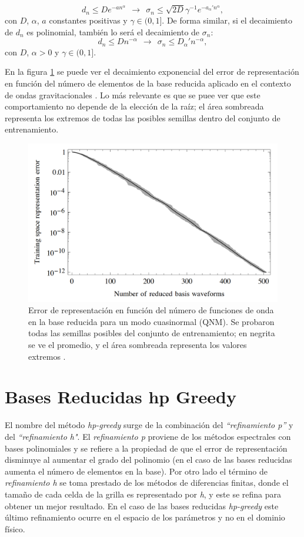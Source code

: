 \[
d_n \leq De^{-an^{\alpha}} \ \ \rightarrow \ \ \sigma_n \leq \sqrt{2D} \gamma^{-1} e^{-a_{\alpha}'n^{\alpha}},
\]
con $D$, $\alpha$, $a$ constantes positivas y $\gamma \in (0,1]$.
De forma similar, si el decaimiento de $d_n$ es polinomial, también lo será el decaimiento de $\sigma_n$:
\[
d_n \leq D n^{-\alpha} \ \ \rightarrow \ \ \sigma_n \leq D_{\alpha}'n^{-\alpha},
\]
con $D$, $\alpha > 0$ y $\gamma \in (0, 1]$.

En la figura \ref{fig:rb_vs_n} se puede ver el decaimiento exponencial del error de representación en función del número de elementos de la base reducida aplicado en el contexto de ondas gravitacionales \cite{Caudill_2012}. Lo más relevante es que se puee ver que este comportamiento no depende de la elección de la raíz; el área sombreada representa los extremos de todas las posibles semillas dentro del conjunto de entrenamiento.


\begin{figure}[h!]
\centering
\includegraphics[width=.8\columnwidth]{figs/rb_vs_n.png}
\caption{Error de representación en función del número de funciones de onda en la base reducida para un modo cuasinormal (QNM). Se probaron todas las semillas posibles del conjunto de entrenamiento; en negrita se ve el promedio, y el área sombreada representa los valores extremos \cite{Caudill_2012}.}
\label{fig:rb_vs_n}
\end{figure}

\section{Bases Reducidas hp Greedy}

El nombre del método \textit{hp-greedy} \cite{Cerino:2022dhr} surge de la combinación del \textit{``refinamiento p''} y del \textit{``refinamiento h"}. El \textit{refinamiento p} proviene de los métodos espectrales con bases polinomiales \cite{hesthaven_gottlieb_gottlieb_2007} y se refiere a la propiedad de que el error de representación disminuye al aumentar el grado del polinomio (en el caso de las bases reducidas aumenta el número de elementos en la base). Por otro lado el término de \textit{refinamiento h} se toma prestado de los métodos de diferencias finitas, donde el tamaño de cada celda de la grilla es representado por \textit{h}, y este se refina para obtener un mejor resultado. En el caso de las bases reducidas \textit{hp-greedy} este último refinamiento ocurre en el espacio de los parámetros y no en el dominio físico.

